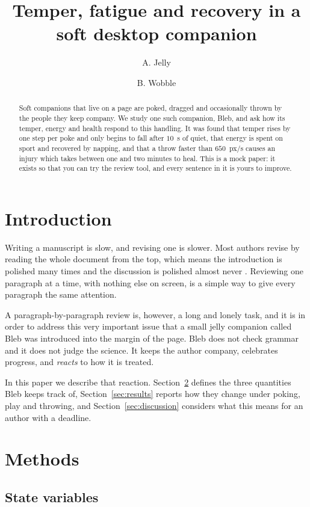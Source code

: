 \documentclass{article}
\title{Temper, fatigue and recovery in a soft desktop companion}
\author{A. Jelly \and B. Wobble}
\begin{document}
\maketitle

\begin{abstract}
Soft companions that live on a page are poked, dragged and occasionally thrown by the people they keep company. We study one such companion, Bleb, and ask how its temper, energy and health respond to this handling. It was found that temper rises by one step per poke and only begins to fall after $10$~s of quiet, that energy is spent on sport and recovered by napping, and that a throw faster than $650$~px/s causes an injury which takes between one and two minutes to heal. This is a mock paper: it exists so that you can try the review tool, and every sentence in it is yours to improve.
\end{abstract}

\section{Introduction}

Writing a manuscript is slow, and revising one is slower. Most authors revise by reading the whole document from the top, which means the introduction is polished many times and the discussion is polished almost never \cite{topheavy}. Reviewing one paragraph at a time, with nothing else on screen, is a simple way to give every paragraph the same attention.

A paragraph-by-paragraph review is, however, a long and lonely task, and it is in order to address this very important issue that a small jelly companion called Bleb was introduced into the margin of the page. Bleb does not check grammar and it does not judge the science. It keeps the author company, celebrates progress, and \emph{reacts} to how it is treated.

In this paper we describe that reaction. Section~\ref{sec:methods} defines the three quantities Bleb keeps track of, Section~\ref{sec:results} reports how they change under poking, play and throwing, and Section~\ref{sec:discussion} considers what this means for an author with a deadline.

\section{Methods}
\label{sec:methods}

\subsection{State variables}
\end{document}
